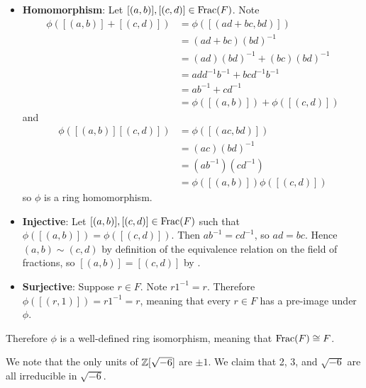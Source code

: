 \begin{questions}
\begin{itemize}
        \item \textbf{Homomorphism}: Let $[(a,b)], [(c,d)] \in \mathrm{Frac}(F)$. Note
        \begin{align*}
            \phi([(a,b)] + [(c,d)]) &= \phi([(ad+bc, bd)])\\
            &= (ad+bc)(bd)^{-1}\\
            &= (ad)(bd)^{-1} + (bc)(bd)^{-1}\\
            &= add^{-1}b^{-1} + bcd^{-1}b^{-1}\\
            &= ab^{-1} + cd^{-1}\\
            &= \phi([(a,b)]) + \phi([(c,d)])
        \end{align*}
        and
        \begin{align*}
            \phi([(a,b)][(c,d)]) &= \phi([(ac,bd)])\\
            &= (ac)(bd)^{-1}\\
            &= (ab^{-1})(cd^{-1})\\
            &= \phi([(a,b)])\phi([(c,d)])
        \end{align*}
        so $\phi$ is a ring homomorphism.

        \item \textbf{Injective}: Let $[(a,b)], [(c,d)] \in \mathrm{Frac}(F)$ such that $\phi([(a,b)]) = \phi([(c,d)])$. Then $ab^{-1} = cd^{-1}$, so $ad = bc$. Hence $(a,b) \mathrel{\sim} (c,d)$ by definition of the equivalence relation on the field of fractions, so $[(a,b)] = [(c,d)]$ by .

        \item \textbf{Surjective}: Suppose $r \in F$. Note $r1^{-1} = r$. Therefore $\phi([(r, 1)]) = r1^{-1} = r$, meaning that every $r \in F$ has a pre-image under $\phi$.
    \end{itemize}
    Therefore $\phi$ is a well-defined ring isomorphism, meaning that $\mathrm{Frac}(F) \cong F$.

    \item We note that the only units of $\mathbb{Z}[\sqrt{-6}]$ are $\pm1$. We claim that 2, 3, and $\sqrt{-6}$ are all irreducible in $\sqrt{-6}$.


\end{questions}
